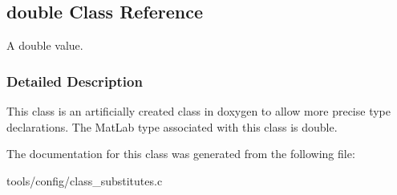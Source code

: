 \hypertarget{classdouble}{}\subsection{double Class Reference}
\label{classdouble}


A double value.  




\subsubsection{Detailed Description}
This class is an artificially created class in doxygen to allow more precise type declarations. The Mat\+Lab type associated with this class is double. 

The documentation for this class was generated from the following file\+:\begin{DoxyCompactItemize}
\item 
tools/config/class\+\_\+substitutes.\+c\end{DoxyCompactItemize}
